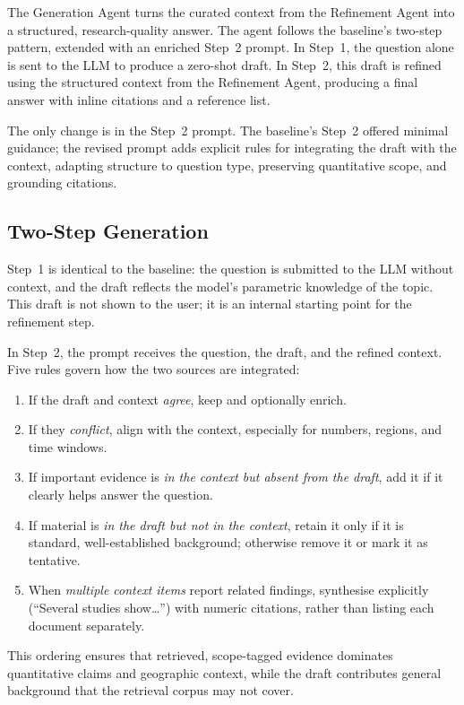 The Generation Agent turns the curated context from the Refinement Agent into a structured, research-quality answer. The agent follows the baseline's two-step pattern, extended with an enriched Step~2 prompt. In Step~1, the question alone is sent to the LLM to produce a zero-shot draft. In Step~2, this draft is refined using the structured context from the Refinement Agent, producing a final answer with inline citations and a reference list.

The only change is in the Step~2 prompt. The baseline's Step~2 offered minimal guidance; the revised prompt adds explicit rules for integrating the draft with the context, adapting structure to question type, preserving quantitative scope, and grounding citations.

\subsection{Two-Step Generation}
\label{subsec:two-step-integration}

Step~1 is identical to the baseline: the question is submitted to the LLM without context, and the draft reflects the model's parametric knowledge of the topic. This draft is not shown to the user; it is an internal starting point for the refinement step.

In Step~2, the prompt receives the question, the draft, and the refined context. Five rules govern how the two sources are integrated:

\begin{enumerate}
\item If the draft and context \emph{agree}, keep and optionally enrich.
\item If they \emph{conflict}, align with the context, especially for numbers, regions, and time windows.
\item If important evidence is \emph{in the context but absent from the draft}, add it if it clearly helps answer the question.
\item If material is \emph{in the draft but not in the context}, retain it only if it is standard, well-established background; otherwise remove it or mark it as tentative.
\item When \emph{multiple context items} report related findings, synthesise explicitly (``Several studies show\ldots'') with numeric citations, rather than listing each document separately.
\end{enumerate}

This ordering ensures that retrieved, scope-tagged evidence dominates quantitative claims and geographic context, while the draft contributes general background that the retrieval corpus may not cover.

